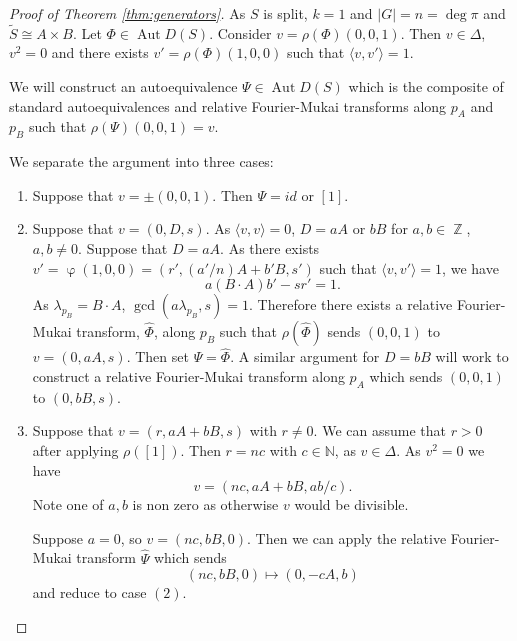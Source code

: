 \documentclass[a4paper, 12pt, twoside]{amsart}
\theoremstyle{plain}
\theoremstyle{definition}
\DeclareMathOperator{\iso}{\cong}
\DeclareMathOperator{\Aut}{Aut}
\DeclareMathOperator{\Z}{\mathbb{Z}}
\DeclareMathOperator{\vp}{\varphi}
\begin{document}
\begin{proof}[Proof of Theorem \ref{thm:generators}]
  As $S$ is split, $k=1$ and $|G|= n= \deg \pi$ and
  $\widetilde{S} \iso A \times B$. Let $\Phi \in \Aut D(S)$. Consider
  $v = \rho(\Phi)(0,0,1)$. Then $v \in \Delta$, $v^2= 0$ and there
  exists $v' = \rho(\Phi)(1,0,0)$ such that
  $\langle v, v' \rangle = 1$.

  We will  construct an autoequivalence $\Psi \in \Aut D(S)$
  which is the composite of standard autoequivalences  and relative
  Fourier-Mukai transforms along $p_A$ and $p_B$ such that
  $\rho(\Psi)(0,0,1) = v$.

  We separate the argument into three cases:

  \begin{enumerate}
  \item Suppose that $v = \pm(0,0,1)$. Then $\Psi = id$ or
    $[1]$.\newline

  \item Suppose that $v = (0,D,s)$. As $\langle v,v \rangle = 0$,
    $D = aA$ or $b B$ for $a,b \in \Z$,
    $a, b \ne 0$. Suppose that $D = a A$. As there
    exists $v'=\vp(1,0,0) = (r', (a'/n) A + b' B,s')$
    such that $\langle v,v'\rangle = 1$, we have
    \[
      a (B \cdot A) b' - sr' =1.
    \]
    As $\lambda_{p_B} = B \cdot A$, $\gcd(a \lambda_{p_B},s)
    =1$. Therefore there exists a relative Fourier-Mukai transform,
    $\hat{\Phi}$, along $p_B$ such that $\rho(\hat{\Phi})$ sends
    $(0,0,1)$ to $v =(0,a A,s)$. Then set $\Psi = \hat{\Phi}$. A
    similar argument for $D= b B$ will work to construct a relative
    Fourier-Mukai transform along $p_A$ which sends $(0,0,1)$ to
    $(0,b B,s)$.  \newline

  \item Suppose that $v = (r,a A + b B,s)$ with $r \ne 0$. We can
    assume that $r>0$ after applying $\rho([1])$. Then $r = nc$ with
    $c \in \mathbb{N}$, as $v \in \Delta$. As $v^2 = 0$ we have
    \[
      v = \left(nc, a A + b B, ab/c \right).
    \]
    Note one of $a,b$ is non zero as otherwise $v$ would be
    divisible.  \newline

    Suppose $a = 0$, so $v = (nc, b B,0)$.  Then we can
    apply the relative Fourier-Mukai transform $\hat{\Psi}$ which
    sends
    \[
      (nc ,b B,0) \mapsto (0,-c A,b)
    \]
    and reduce to case $(2)$. \newline


\end{enumerate}
\end{proof}
\end{document}
